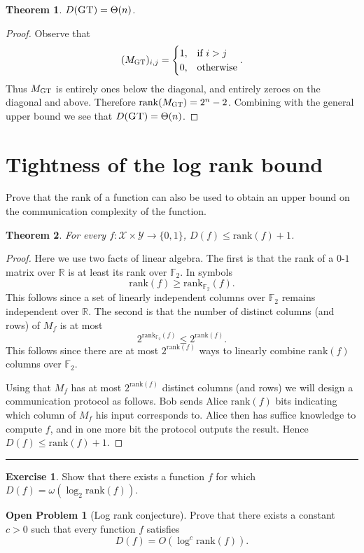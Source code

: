 \documentclass[11pt]{amsart}
\theoremstyle{plain}
\newtheorem{theorem}{Theorem}
\theoremstyle{definition}
\newtheorem{exercise}{Exercise}
\newtheorem{open}{Open Problem}
\theoremstyle{plain}
\newcommand{\calX}{\mathcal{X}}
\newcommand{\calY}{\mathcal{Y}}
\newcommand{\GT}{\textsc{GT}}
\newcommand{\rank}{\mathrm{rank}}
\newcommand{\exercises}{\bigskip \noindent\rule{8cm}{0.4pt} \medskip}
\begin{document}
\begin{theorem}
$D(\GT) = \Theta(n)$.
\end{theorem}

\begin{proof}
	Observe that 
	$$(M_\GT)_{i,j} = \begin{cases}
		1, &\text{if } i>j \\
		0, &\text{otherwise}
	\end{cases}.$$
	Thus $M_\GT$ is entirely ones below the diagonal, and entirely zeroes on the diagonal and above. Therefore $\rank(M_\GT) = 2^n-2$. Combining with the general upper bound we see that $D(\GT) = \Theta(n)$.
\end{proof}



\newpage \section{Tightness of the log rank bound}

Prove that the rank of a function can also be used to obtain an upper bound on the communication complexity of the function.

\begin{theorem}
For every $f : \calX \times \calY \to \{0,1\}$, $D(f) \le \rank(f) + 1$.
\end{theorem}

\begin{proof}
Here we use two facts of linear algebra. The first is that the rank of a $0$-$1$ matrix over $\mathbb{R}$ is at least its rank over $\mathbb{F}_2$. In symbols $$\rank(f) \geq \rank_{\mathbb{F}_2}(f).$$
This follows since a set of linearly independent columns over $\mathbb{F}_2$ remains independent over $\mathbb{R}$.
The second is that the number of distinct columns (and rows) of $M_f$ is at most $$2^{\rank_{\mathbb{F}_2}(f)} \leq 2^{\rank(f)}.$$
This follows since there are at most $2^{\rank(f)}$ ways to linearly combine $\rank(f)$ columns over $\mathbb{F}_2$.

Using that $M_f$ has at most $2^{\rank(f)}$ distinct columns (and rows) we will design a communication protocol as follows. Bob sends Alice $\rank(f)$ bits indicating which column of $M_f$ his input corresponds to. Alice then has suffice knowledge to compute $f$, and in one more bit the protocol outputs the result. Hence
$D(f) \leq \rank(f) + 1$.
\end{proof}

\exercises

\begin{exercise} %
Show that there exists a function $f$ for which $D(f) = \omega( \log_2 \rank(f) )$.
\end{exercise}

\begin{open}[Log rank conjecture]
Prove that there exists a constant $c > 0$ such that every function $f$ satisfies
\[
D(f) = O( \log^c \rank(f)).
\]
\end{open}
\end{document}
